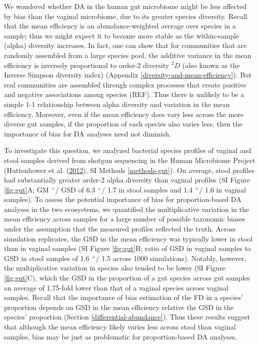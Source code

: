 \documentclass[
]{article}
\newcommand{\md}{^{\times}\!/}
\begin{document}
We wondered whether DA in the human gut microbiome might be less affected by bias than the vaginal microbiome, due to its greater species diversity.
Recall that the mean efficiency is an abundance-weighted average over species in a sample; thus we might expect it to become more stable as the within-sample (alpha) diversity increases.
In fact, one can show that for communities that are randomly assembled from a large species pool, the additive variance in the mean efficiency is inversely proportional to order-2 diversity \(^2D\) (also known as the Inverse Simpson diversity index) (Appendix \ref{diversity-and-mean-efficiency}).
But real communities are assembled through complex processes that create positive and negative associations among species (REF).
Thus there is unlikely to be a simple 1-1 relationship between alpha diversity and variation in the mean efficiency.
Moreover, even if the mean efficiency does vary less across the more diverse gut samples, if the proportion of each species also varies less, then the importance of bias for DA analyses need not diminish.

To investigate this question, we analyzed bacterial species profiles of vaginal and stool samples derived from shotgun sequencing in the Human Microbiome Project (Huttenhower et al. (\protect\hyperlink{ref-huttenhower2012stru}{2012}), SI Methods \ref{methods-gut}).
On average, stool profiles had substantially greater order-2 alpha diversity than vaginal profiles (SI Figure \ref{fig:gut}A; GM \(\md\) GSD of 6.3 \(\md\) 1.7 in stool samples and 1.4 \(\md\) 1.6 in vaginal samples).
To assess the potential importance of bias for proportion-based DA analyses in the two ecosystems, we quantified the multiplicative variation in the mean efficiency across samples for a large number of possible taxonomic biases under the assumption that the measured profiles reflected the truth.
Across simulation replicates, the GSD in the mean efficiency was typically lower in stool than in vaginal samples (SI Figure \ref{fig:gut}B; ratio of GSD in vaginal samples to GSD in stool samples of 1.6 \(\md\) 1.5 across 1000 simulations).
Notably, however, the multiplicative variation in species also tended to be lower (SI Figure \ref{fig:gut}C), which the GSD in the proportion of a gut species across gut samples an average of 1.75-fold lower than that of a vaginal species across vaginal samples.
Recall that the importance of bias estimation of the FD in a species' proportion depends on GSD in the mean efficiency relative the GSD in the species' proportion (Section \ref{differential-abundance}).
Thus these results suggest that although the mean efficiency likely varies less across stool than vaginal samples, bias may be just as problematic for proportion-based DA analyses.
\end{document}
